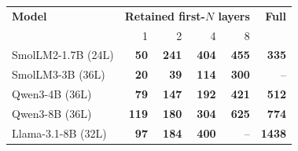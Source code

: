 \begin{tabular}{lrrrrr}
\toprule
\textbf{Model} & \multicolumn{4}{c}{\textbf{Retained first-$N$ layers}} & \textbf{Full} \\
 & 1 & 2 & 4 & 8 & \\
\midrule
 SmolLM2-1.7B (24L) & \cellcolor[HTML]{B5D4E9}\textcolor[HTML]{172430}{\textbf{50}} & \cellcolor[HTML]{4594C7}\textcolor[HTML]{FFFFFF}{\textbf{241}} & \cellcolor[HTML]{2A7AB9}\textcolor[HTML]{FFFFFF}{\textbf{404}} & \cellcolor[HTML]{2373B6}\textcolor[HTML]{FFFFFF}{\textbf{455}} & \cellcolor[HTML]{3383BE}\textcolor[HTML]{FFFFFF}{\textbf{335}} \\
 SmolLM3-3B (36L) & \cellcolor[HTML]{DFECF7}\textcolor[HTML]{172430}{\textbf{20}} & \cellcolor[HTML]{C6DBEF}\textcolor[HTML]{172430}{\textbf{39}} & \cellcolor[HTML]{79B5D9}\textcolor[HTML]{172430}{\textbf{114}} & \cellcolor[HTML]{3989C1}\textcolor[HTML]{FFFFFF}{\textbf{300}} & \cellcolor[HTML]{EFEFEF}\textcolor[HTML]{B0B0B0}{--} \\
 Qwen3-4B (36L) & \cellcolor[HTML]{97C6DF}\textcolor[HTML]{172430}{\textbf{79}} & \cellcolor[HTML]{65AAD4}\textcolor[HTML]{172430}{\textbf{147}} & \cellcolor[HTML]{549FCD}\textcolor[HTML]{172430}{\textbf{192}} & \cellcolor[HTML]{2777B8}\textcolor[HTML]{FFFFFF}{\textbf{421}} & \cellcolor[HTML]{1E6DB2}\textcolor[HTML]{FFFFFF}{\textbf{512}} \\
 Qwen3-8B (36L) & \cellcolor[HTML]{75B4D8}\textcolor[HTML]{172430}{\textbf{119}} & \cellcolor[HTML]{58A1CF}\textcolor[HTML]{172430}{\textbf{180}} & \cellcolor[HTML]{3888C1}\textcolor[HTML]{FFFFFF}{\textbf{304}} & \cellcolor[HTML]{1663AA}\textcolor[HTML]{FFFFFF}{\textbf{625}} & \cellcolor[HTML]{0E58A2}\textcolor[HTML]{FFFFFF}{\textbf{774}} \\
 Llama-3.1-8B (32L) & \cellcolor[HTML]{85BCDC}\textcolor[HTML]{172430}{\textbf{97}} & \cellcolor[HTML]{57A0CE}\textcolor[HTML]{172430}{\textbf{184}} & \cellcolor[HTML]{2A7AB9}\textcolor[HTML]{FFFFFF}{\textbf{400}} & \cellcolor[HTML]{EFEFEF}\textcolor[HTML]{B0B0B0}{--} & \cellcolor[HTML]{083776}\textcolor[HTML]{FFFFFF}{\textbf{1438}} \\
\bottomrule
\end{tabular}
